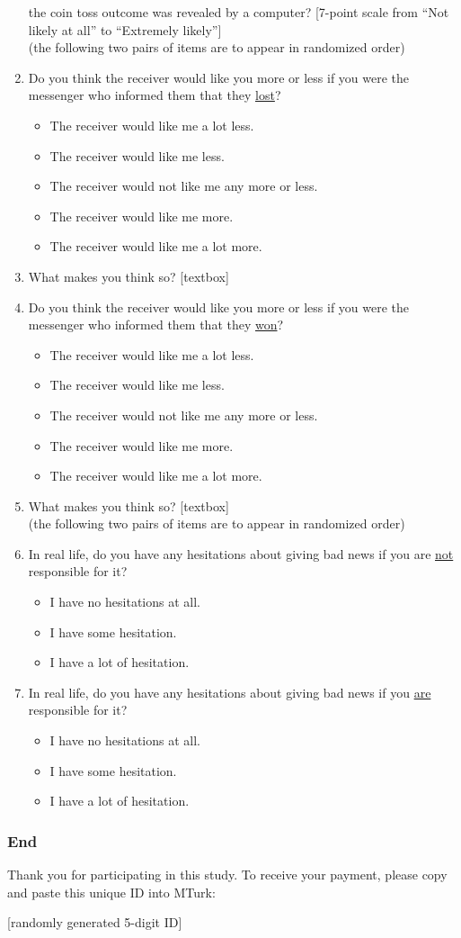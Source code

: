 \begin{enumerate}
    the coin toss outcome was revealed by a computer? [7-point scale from
    ``Not likely at all'' to ``Extremely likely'']
    \\(the following two
    pairs of items are to appear in randomized order)    
    \item Do you think the receiver would like you more or less if you
    were the messenger who informed them that they \underline{lost}? 
    \begin{itemize}
	    \item The receiver would like me a lot less.
	    \item The receiver would like me less.
	    \item The receiver would not like me any more or less.
	    \item The receiver would like me more. 
	    \item The receiver would like me a lot more.
    \end{itemize}
    \item What makes you think so? [textbox]
    \item Do you think the receiver would like you more or less if you
    were the messenger who informed them that they \underline{won}?
    \begin{itemize}
	    \item The receiver would like me a lot less.
	    \item The receiver would like me less.
	    \item The receiver would not like me any more or less.
	    \item The receiver would like me more. 
	    \item The receiver would like me a lot more.
    \end{itemize}
    \item What makes you think so? [textbox]
    \\ (the following two
    pairs of items are to appear in randomized order)    
    \item In real life, do you have any hesitations about giving bad
    news if you are \underline{not} responsible for it?
    \begin{itemize}
        \item I have no hesitations at all.
        \item I have some hesitation.
        \item I have a lot of hesitation.
    \end{itemize}
    \item In real life, do you have any hesitations about giving bad
    news if you \underline{are} responsible for it?
    \begin{itemize}
        \item I have no hesitations at all.
        \item I have some hesitation.
        \item I have a lot of hesitation.
    \end{itemize}
\end{enumerate}

\subsubsection*{End}

Thank you for participating in this study. To receive your payment, please copy
and paste this unique ID into MTurk: 

[randomly generated 5-digit ID]

